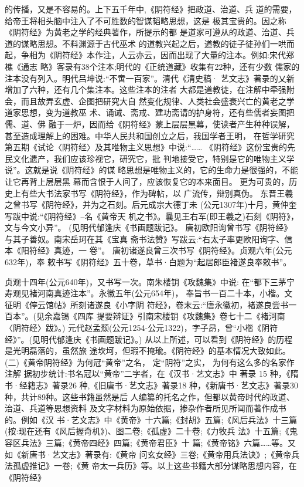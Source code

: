 \documentclass[12pt,UTF8]{ctexbook}
\begin{document}
的传播，又是不容易的。上下五千年中,《阴符经》把政道、治道、兵
道的需要，给帝王将相头脑中注入了不可胜数的智谋韬略思想，这是
极其宝贵的。因之称《阴符经》为黄老之学的经典著作，所提示的都
是道家可遵从的政道、治道、兵道的谋略思想。不料渊源于古代巫术
的道教兴起之后，道教的徒子徒孙们一哄而起，争相为《阴符经》本作注，人云亦云，因而出现了大量的注本。例如:宋代郑樵《通志
略》客录有38个注本;明代的《正统道藏》收集有22种，还有少数
儒家的注本没有列入。明代吕坤说:“不啻一百家”。清代《清史稿·
艺文志》著录的乂新增加了六种，还有几个集注本。这些注本的注者
大都是道教徒，在注解中牵强附会，而且故弄玄虚、企图把研究大自
然变化规律、人类社会盛衰兴亡的黄老之学道家思想，变为道教巫
术、诵诫、斋戒、建功斋请的护身符，还有些儒者妄图把儒、道、佛
融于一炉，因而给《阴符经》蒙上层层黑幕，使读者产生种种误解，
甚至造成理解上的困难。中华人民共和国创立之后，我国学者王明，
在哲学研究第五期《试论〈阴符经〉及其唯物主义思想》中说:“……
《阴符经》这份宝贵的先民文化遗产，我们应该珍视它，研究它，批
判地接受它，特别是它的唯物主义学说”。这就是说《阴符经》的谋
略思想是唯物主义的，它的生命力是很强的，不能让它再背上层层黑
幕而含恨于人间了，应该恢复它的本来面目。
更为可贵的，历史上有些大书法家书写《阴符经》，作为碑帖，以
广流传，辩别真伪。
东晋王羲之曾书写《阴符经》，并为之石刻。后元成宗大德丁未
(公元1307年)十月，黄仲奎写跋中说:“《阴符经》--名《黄帝天
机之书》。曩见王右军(即王羲之)石刻《阴符》，文与今文小异”。
(见明代郁逢庆《书画题跋记》。
唐初欧阳询曾书写《阴符经》与其子善奴。南宋岳珂在其《宝真
斋书法赞》写跋云:“右太子率更欧阳询字、信本《阳符经》真迹，一
卷”。
唐初诸遂良曾三次书写《阴符经》。贞观六年(公元632年)，奉
敕书写《阴符经》五十卷，草书·白题为“起居郎臣褚遂良奉敕书”。

贞观十四年(公元640年)，又书写一次。南朱楼钥《攻魏集》中说:
在“都下三茅宁寿观见褚河南真迹注本”。永徽五年(公元654年)，
奉旨书一百二十本，小楷。文征明《停云馆帖》所刻诸遂良《小字阴
符经》，卷末云:“唐永徽初，褚遂良尝书一百本”。(见余嘉锡《四库
提要辩证》引南宋楼钥《攻魏集》卷七十二《褚河南〈阴符经〉跋》。)
元代赵孟颓(公元1254-公元1322)，字子昂，曾“小楷《阴符
经》”。(见明代郁逢庆《书画题跋记》。)
从以上所述，可以看到《阴符经》的历程是光明磊落的，虽然旅
途坎坷，但瑕不掩瑜。《阴符经》的基本情况大致如此。
(二)《黄帝阴符经》为何冠“黄帝”之名，
定“阴符”之实，
为何有这么多的名家作注解
据初步统计:书名冠以“黄帝”二字者，在《汉书·艺文志》中
著录 15 种，《隋书·经籍志》著录26 种,《旧唐书·艺文志》著录18
种，《新唐书·艺文志》著录30种，共计89种。这些书籍虽然是后
人编纂的托名之作，但都以黄帝时代的政道、治道、兵道等思想资料
及文字材料为原始依据，掺杂作者所见所闻而著作成书的。例如《汉
书·艺文志》中《黄帝》十六篇;《封胡》五篇;《风后兵法》十三篇
(按:现在还有《风后握奇机》)、图二卷;《孤虚》二十卷;《力牧兵
法》十五篇;《鬼容区兵法》三篇;《黄帝四经》四篇;《黄帝君臣》十
篇;《黄帝铭》六篇……等。又如《新唐书·艺文志》著录有:《黄帝
问玄女经》三卷;《黄帝用兵法诀》;《黄帝兵法孤虚推记》一卷;《黄
帝太一兵历》等。以上这些书籍大部分谋略思想内容，在《阴符经》
\end{document}

